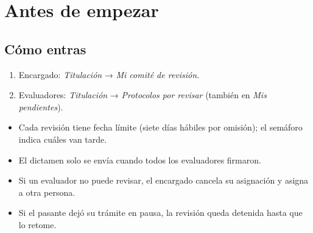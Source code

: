 \section{Antes de empezar}
\subsection*{Cómo entras}
\begin{enumerate}
  \item Encargado: \emph{Titulación} → \emph{Mi comité de revisión}.
  \item Evaluadores: \emph{Titulación} → \emph{Protocolos por revisar} (también en \emph{Mis pendientes}).
\end{enumerate}
\begin{tencuenta}
\begin{itemize}
  \item Cada revisión tiene fecha límite (siete días hábiles por omisión); el semáforo indica cuáles van tarde.
  \item El dictamen solo se envía cuando todos los evaluadores firmaron.
\end{itemize}
\end{tencuenta}
\begin{algosalemal}
\begin{itemize}
  \item Si un evaluador no puede revisar, el encargado cancela su asignación y asigna a otra persona.
  \item Si el pasante dejó su trámite en pausa, la revisión queda detenida hasta que lo retome.
\end{itemize}
\end{algosalemal}
